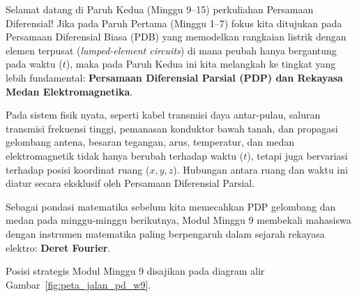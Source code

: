 \documentclass[11pt,a4paper]{article}
\theoremstyle{definition}
\begin{document}
Selamat datang di Paruh Kedua (Minggu 9--15) perkuliahan Persamaan Diferensial! Jika pada Paruh Pertama (Minggu 1--7) fokus kita ditujukan pada Persamaan Diferensial Biasa (PDB) yang memodelkan rangkaian listrik dengan elemen terpusat (\textit{lumped-element circuits}) di mana peubah hanya bergantung pada waktu ($t$), maka pada Paruh Kedua ini kita melangkah ke tingkat yang lebih fundamental: \textbf{Persamaan Diferensial Parsial (PDP) dan Rekayasa Medan Elektromagnetika}.

Pada sistem fisik nyata, seperti kabel transmisi daya antar-pulau, saluran transmisi frekuensi tinggi, pemanasan konduktor bawah tanah, dan propagasi gelombang antena, besaran tegangan, arus, temperatur, dan medan elektromagnetik tidak hanya berubah terhadap waktu ($t$), tetapi juga bervariasi terhadap posisi koordinat ruang ($x, y, z$). Hubungan antara ruang dan waktu ini diatur secara eksklusif oleh Persamaan Diferensial Parsial.

Sebagai pondasi matematika sebelum kita memecahkan PDP gelombang dan medan pada minggu-minggu berikutnya, Modul Minggu 9 membekali mahasiswa dengan instrumen matematika paling berpengaruh dalam sejarah rekayasa elektro: \textbf{Deret Fourier}.

Posisi strategis Modul Minggu 9 disajikan pada diagram alir Gambar~\ref{fig:peta_jalan_pd_w9}.
\end{document}
